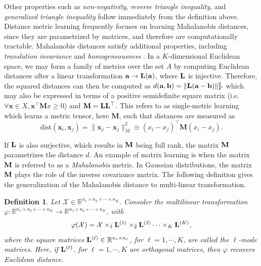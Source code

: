 \documentclass{article}
\newcommand{\T}{\mathcal}
\newcommand{\m}[1]{{\bf{#1}}}
\newtheorem{definition}{Definition}
\begin{document}
Other properties such as \emph{non-negativity}, \emph{reverse triangle inequality}, and \emph{generalized triangle inequality} follow immediately from the definition above. 
Distance metric learning frequently focuses on learning Mahalanobis distances, since they
are parametrized by matrices, and therefore are computationally tractable. Mahalanobis distances satisfy additional properties, including \emph{translation invariance} and \emph{homogeneousness} \cite{suarez2018tutorial}. In a $K$-dimensional Euclidean space, we may form a family of metrics over the set $A$ by computing Euclidean distances after a linear transformation $\m a\to\m L(\m a)$, where $\m L$ is injective. Therefore, the squared distances can then be computed as $d(\m a,\m b)=\|\m L(\m a-\m b)\|^2_F$ which may also be expressed in terms of a positive semidefinite square matrix (i.e. $\forall \mathbf x\in X, \mathbf x^\top \mathbf M x\ge 0$) and $\m M = \mathbf L\mathbf L^\top$. This refers to as single-metric learning which learns a metric tensor, here $\mathbf M$, such that distances are measured as
$$\mathrm{dist}(\mathbf x_i,\mathbf x_j)=\|\mathbf x_j-\mathbf x_j\|^2_M\equiv (x_i-x_j)^\top \mathbf M (x_i-x_j). $$ 






If $\m L$ is also surjective, which results in $\m M$ being full rank, the matrix $\m M$ parametrizes the distance $d$. An example of matrix learning is when the matrix $\m M$ is referred to as a \emph{Mahalanobis} metric. In Gaussian distributions, the matrix $\m M$ plays the role of the inverse covariance matrix. The following definition gives the generalization of the Mahalanobis distance to multi-linear transformation.
\begin{definition}\label{def:maha}
Let $\T X\in \mathbb R^{n_1\times n_2\times \cdots\times n_K}$. Consider the multilinear transformation \\
$ \varphi:\mathbb R^{n_1\times n_2\times \cdots\times n_K}\to \mathbb R^{n_1\times n_2\times \cdots\times n_K}$, with
\begin{align}
\varphi(\T X)= \T X\times_1 \m L^{(1)}\times_2 \m L^{(2)}\cdots \times_K \m L^{(K)}, 
\end{align}
where the square matrices $\m L^{(\ell)}\in \mathbb R^{n_\ell\times n_\ell}$, for $\ell=1,\cdots, K$, are called the $\ell$-mode matrices. Here, if $\m L^{(\ell)}$, for $\ell=1, \cdots, K$ are orthogonal matrices, then $ \varphi$ recovers Euclidean distance.
\end{definition}
\end{document}
